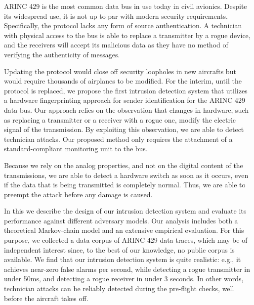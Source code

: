 ARINC 429 is the most common data bus in use today in civil avionics. Despite its widespread use, it is not up to par with modern security requirements. Specifically, the protocol lacks any form of source authentication. A technician with physical access to the bus is able to replace a transmitter by a rogue device, and the receivers will accept its malicious data as they have no method of verifying the authenticity of messages.

Updating the protocol would close off security loopholes in new aircrafts but would require thousands of airplanes to be modified. For the interim, until the protocol is replaced, we propose the first intrusion detection system that utilizes a hardware fingerprinting approach for sender identification for the ARINC 429 data bus. Our approach relies on the observation that changes in hardware, such as replacing a transmitter or a receiver with a rogue one, modify the electric signal of the transmission. By exploiting this observation, we are able to detect technician attacks. Our proposed method only requires the attachment of a standard-compliant monitoring unit to the bus. 

Because we rely on the analog properties, and not on the digital content of the transmissions, we are able to detect a hardware switch as soon as it occurs, even if the data that is being transmitted is completely normal. Thus, we are able to preempt the attack before any damage is caused.

In this \iftoggle{paper} {paper} {work} we describe the design of our intrusion detection system and evaluate its performance against different adversary models. Our analysis includes both a theoretical Markov-chain model and an extensive empirical evaluation. For this purpose, we collected a data corpus of ARINC 429 data traces, which may be of independent interest since, to the best of our knowledge, no public corpus is available. We find that our intrusion detection system is quite realistic: e.g., it achieves near-zero false alarms per second, while detecting a rogue transmitter in under 50ms, and detecting a rogue receiver in under 3 seconds. In other words, technician attacks can be reliably detected during the pre-flight checks, well before the aircraft takes off.
